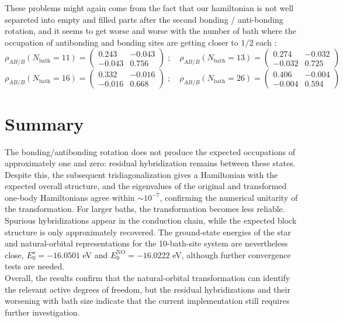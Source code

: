 \documentclass[11pt]{article}
\newcommand{\bath}{\text{bath}}
\begin{document}
These problems might again come from the fact that our hamiltonian is not well separeted into empty and filled parts after the second bonding / anti-bonding rotation, and it seems to get worse and worse with the number of bath where the occupation of antibonding and bonding sites are getting closer to $1/2$ each :
\begin{equation}
	\rho_{AB/B}(N_\bath=11) =
	\begin{pmatrix}
		0.243 & -0.043 \\
		-0.043 & 0.756 
	\end{pmatrix}\; ;\quad
	\rho_{AB/B}(N_\bath=13) =
	\begin{pmatrix}
		0.274 & -0.032 \\
		-0.032 & 0.725 
	\end{pmatrix}
\end{equation}
\begin{equation}
	\rho_{AB/B}(N_\bath=16) =
	\begin{pmatrix}
		0.332 & -0.016 \\
		-0.016 & 0.668 
	\end{pmatrix}\; ;\quad
	\rho_{AB/B}(N_\bath=26) =
	\begin{pmatrix}
		0.406 & -0.004 \\
		-0.004 & 0.594 
	\end{pmatrix}
\end{equation}

\section{Summary}
The bonding/antibonding rotation does not produce the expected occupations of approximately one and zero: residual hybridization remains between these states. Despite this, the subsequent tridiagonalization gives a Hamiltonian with the expected overall structure, and the eigenvalues of the original and transformed one-body Hamiltonians agree within $\sim10^{-7}$, confirming the numerical unitarity of the transformation. For larger baths, the transformation becomes less reliable. Spurious hybridizations appear in the conduction chain, while the expected block structure is only approximately recovered. The ground-state energies of the star and natural-orbital representations for the 10-bath-site system are nevertheless close, $E^\star_0=-16.0501$ eV and $E^{\mathrm{NO}}_0=-16.0222$ eV, although further convergence tests are needed.\\
Overall, the results confirm that the natural-orbital transformation can identify the relevant active degrees of freedom, but the residual hybridizations and their worsening with bath size indicate that the current implementation still requires further investigation.



\end{document}
